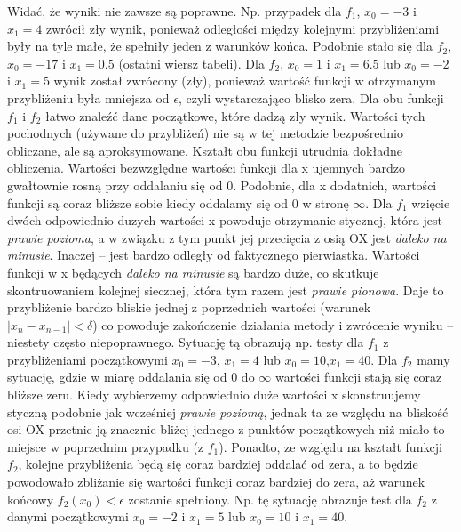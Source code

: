 \documentclass[]{article}
\begin{document}
	Widać, że wyniki nie zawsze są poprawne. Np. przypadek dla $f_1$, $x_0=-3$ i $x_1=4$ zwrócił zły wynik, ponieważ odległości między kolejnymi przybliżeniami były na tyle małe, że spełniły jeden z warunków końca. Podobnie stało się dla $f_2$, $x_0=-17$ i $x_1=0.5$ (ostatni wiersz tabeli). Dla $f_2$, $x_0=1$ i $x_1=6.5$ lub $x_0=-2$ i $x_1=5$ wynik został zwrócony (zły), ponieważ wartość funkcji w otrzymanym przybliżeniu była mniejsza od $\epsilon$, czyli wystarczająco blisko zera. Dla obu funkcji $f_1$ i $f_2$ łatwo znaleźć dane początkowe, które dadzą zły wynik. Wartości tych pochodnych (używane do przybliżeń) nie są w tej metodzie bezpośrednio obliczane, ale są aproksymowane. Kształt obu funkcji utrudnia dokładne obliczenia. Wartości bezwzględne wartości funkcji dla x ujemnych bardzo gwałtownie rosną przy oddalaniu się od 0. Podobnie, dla x dodatnich, wartości funkcji są coraz bliższe sobie kiedy oddalamy się od 0 w stronę $\infty$. Dla $f_1$ wzięcie dwóch odpowiednio duzych wartości x powoduje otrzymanie stycznej, która jest \textit{prawie pozioma}, a w związku z tym punkt jej przecięcia z osią OX jest \textit{daleko na minusie}. Inaczej -- jest bardzo odległy od faktycznego pierwiastka. Wartości funkcji w x będących \textit{daleko na minusie} są bardzo duże, co skutkuje skontruowaniem kolejnej siecznej, która tym razem jest \textit{prawie pionowa}. Daje to przybliżenie bardzo bliskie jednej z poprzednich wartości (warunek $|x_n-x_{n-1}|<\delta$) co powoduje zakończenie działania metody i zwrócenie wyniku -- niestety często niepoprawnego. Sytuację tą obrazują np. testy dla $f_1$ z przybliżeniami początkowymi $x_0=-3$, $x_1=4$ lub $x_0=10$,$x_1=40$. Dla $f_2$ mamy sytuację, gdzie w miarę oddalania się od 0 do $\infty$ wartości funkcji stają się coraz bliższe zeru. Kiedy wybierzemy odpowiednio duże wartości x skonstruujemy styczną podobnie jak wcześniej \textit{prawie poziomą}, jednak ta ze względu na bliskość osi OX przetnie ją znacznie bliżej jednego z punktów początkowych niż miało to miejsce w poprzednim przypadku (z $f_1$). Ponadto, ze względu na kształt funkcji $f_2$, kolejne przybliżenia będą się coraz bardziej oddalać od zera, a to będzie powodowało zbliżanie się wartości funkcji coraz bardziej do zera, aż warunek końcowy $f_2(x_0)<\epsilon$ zostanie spełniony. Np. tę sytuację obrazuje test dla $f_2$ z danymi początkowymi $x_0=-2$ i $x_1=5$ lub $x_0=10$ i $x_1=40$.
	
\end{document}
